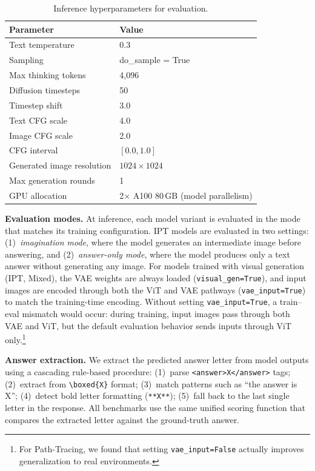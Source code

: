 \documentclass{llmxive}
\begin{document}
\begin{table}[h]
\centering
\small
\begin{tabular}{ll}
\toprule
\textbf{Parameter} & \textbf{Value} \\
\midrule
Text temperature & 0.3 \\
Sampling & do\_sample = True \\
Max thinking tokens & 4{,}096 \\
\midrule
Diffusion timesteps & 50 \\
Timestep shift & 3.0 \\
Text CFG scale & 4.0 \\
Image CFG scale & 2.0 \\
CFG interval & $[0.0, 1.0]$ \\
Generated image resolution & $1024 \times 1024$ \\
Max generation rounds & 1 \\
\midrule
GPU allocation & 2$\times$ A100 80\,GB (model parallelism) \\
\bottomrule
\end{tabular}
\caption{Inference hyperparameters for evaluation.}
\label{tab:supp_eval_params}
\end{table}

\noindent\textbf{Evaluation modes.}
At inference, each model variant is evaluated in the mode that matches its training configuration.
IPT models are evaluated in two settings: (1)~\emph{imagination mode}, where the model generates an intermediate image before answering, and (2)~\emph{answer-only mode}, where the model produces only a text answer without generating any image.
For models trained with visual generation (IPT, Mixed), the VAE weights are always loaded (\texttt{visual\_gen=True}), and input images are encoded through both the ViT and VAE pathways (\texttt{vae\_input=True}) to match the training-time encoding.
Without setting \texttt{vae\_input=True}, a train--eval mismatch would occur: during training, input images pass through both VAE and ViT, but the default evaluation behavior sends inputs through ViT only.\footnote{For Path-Tracing, we found that setting \texttt{vae\_input=False} actually improves generalization to real environments.}

\noindent\textbf{Answer extraction.}
We extract the predicted answer letter from model outputs using a cascading rule-based procedure:
(1)~parse \texttt{<answer>X</answer>} tags;
(2)~extract from \texttt{\textbackslash boxed\{X\}} format;
(3)~match patterns such as ``the answer is X'';
(4)~detect bold letter formatting (\texttt{**X**});
(5)~fall back to the last single letter in the response.
All benchmarks use the same unified scoring function that compares the extracted letter against the ground-truth answer.
\end{document}
